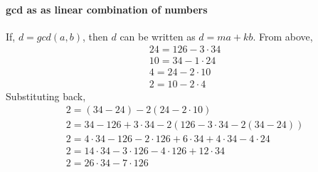 \documentclass[12pt]{article}
\begin{document}
\paragraph{gcd as as linear combination of numbers}
  If, $d = gcd(a,b)$, then $d$ can be written as $d = ma + kb$. From above,
  \begin{align}
    24 = 126 - 3 \cdot 34 \\
    10 = 34 - 1 \cdot 24 \\
    4 = 24 - 2 \cdot 10 \\
    2 = 10 - 2 \cdot 4
  \end{align}
  Substituting back,
  \begin{align}
    2 = ( 34 -24 ) - 2(24 - 2 \cdot 10) \\
    2 = 34 - 126 + 3 \cdot 34  -2 ( 126 - 3 \cdot 34 - 2( 34 -24)) \\
    2  = 4 \cdot 34  - 126  - 2\cdot126 + 6\cdot34 + 4\cdot34 - 4\cdot24 \\
    2 = 14\cdot34 - 3\cdot126 - 4\cdot 126 + 12\cdot34 \\
    2 = 26\cdot34 - 7\cdot126
  \end{align}
\end{document}
